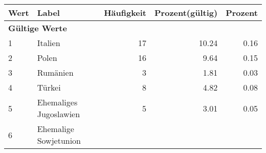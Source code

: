      \begin{longtable}{lXrrr}
     \toprule
     \textbf{Wert} & \textbf{Label} & \textbf{Häufigkeit} & \textbf{Prozent(gültig)} & \textbf{Prozent} \\
     \endhead
     \midrule
     \multicolumn{5}{l}{\textbf{Gültige Werte}}\\

     1 &
     \multicolumn{1}{X}{ Italien   } &


       \num{17} &
       \num[round-mode=places,round-precision=2]{10,24} &
         \num[round-mode=places,round-precision=2]{0,16} \\

     2 &
     \multicolumn{1}{X}{ Polen   } &


       \num{16} &
       \num[round-mode=places,round-precision=2]{9,64} &
         \num[round-mode=places,round-precision=2]{0,15} \\

     3 &
     \multicolumn{1}{X}{ Rumänien   } &


       \num{3} &
       \num[round-mode=places,round-precision=2]{1,81} &
         \num[round-mode=places,round-precision=2]{0,03} \\

     4 &
     \multicolumn{1}{X}{ Türkei   } &


       \num{8} &
       \num[round-mode=places,round-precision=2]{4,82} &
         \num[round-mode=places,round-precision=2]{0,08} \\

     5 &
     \multicolumn{1}{X}{ Ehemaliges Jugoslawien   } &


       \num{5} &
       \num[round-mode=places,round-precision=2]{3,01} &
         \num[round-mode=places,round-precision=2]{0,05} \\

     6 &
     \multicolumn{1}{X}{ Ehemalige Sowjetunion   } &



\end{longtable}
